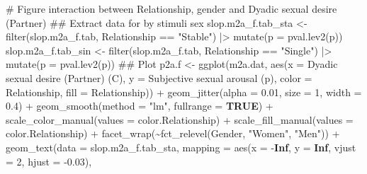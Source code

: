 \documentclass[
  bookmarksnumbered]{article}
\newenvironment{Shaded}{\begin{snugshade}}{\end{snugshade}}
\newcommand{\AttributeTok}[1]{\textcolor[rgb]{0.80,0.80,0.80}{#1}}
\newcommand{\CommentTok}[1]{\textcolor[rgb]{0.50,0.62,0.50}{#1}}
\newcommand{\ConstantTok}[1]{\textcolor[rgb]{0.86,0.64,0.64}{\textbf{#1}}}
\newcommand{\DecValTok}[1]{\textcolor[rgb]{0.86,0.86,0.80}{#1}}
\newcommand{\DocumentationTok}[1]{\textcolor[rgb]{0.50,0.62,0.50}{#1}}
\newcommand{\FloatTok}[1]{\textcolor[rgb]{0.75,0.75,0.82}{#1}}
\newcommand{\FunctionTok}[1]{\textcolor[rgb]{0.94,0.94,0.56}{#1}}
\newcommand{\NormalTok}[1]{\textcolor[rgb]{0.80,0.80,0.80}{#1}}
\newcommand{\OtherTok}[1]{\textcolor[rgb]{0.94,0.94,0.56}{#1}}
\newcommand{\SpecialCharTok}[1]{\textcolor[rgb]{0.86,0.64,0.64}{#1}}
\newcommand{\StringTok}[1]{\textcolor[rgb]{0.80,0.58,0.58}{#1}}
\begin{document}
\begin{Shaded}
\begin{Highlighting}[]
\CommentTok{\# Figure interaction between Relationship, gender and Dyadic sexual desire (Partner)}
\DocumentationTok{\#\# Extract data for by stimuli sex}
\NormalTok{slop.m2a\_f.tab\_sta }\OtherTok{\textless{}{-}} \FunctionTok{filter}\NormalTok{(slop.m2a\_f.tab, Relationship }\SpecialCharTok{==} \StringTok{"Stable"}\NormalTok{) }\SpecialCharTok{|\textgreater{}}
  \FunctionTok{mutate}\NormalTok{(}\AttributeTok{p =} \FunctionTok{pval.lev2}\NormalTok{(p))}
\NormalTok{slop.m2a\_f.tab\_sin }\OtherTok{\textless{}{-}} \FunctionTok{filter}\NormalTok{(slop.m2a\_f.tab, Relationship }\SpecialCharTok{==} \StringTok{"Single"}\NormalTok{) }\SpecialCharTok{|\textgreater{}}
  \FunctionTok{mutate}\NormalTok{(}\AttributeTok{p =} \FunctionTok{pval.lev2}\NormalTok{(p))}
\DocumentationTok{\#\# Plot}
\NormalTok{p2a.f }\OtherTok{\textless{}{-}} \FunctionTok{ggplot}\NormalTok{(m2a.dat, }\FunctionTok{aes}\NormalTok{(}\AttributeTok{x =} \StringTok{\textasciigrave{}}\AttributeTok{Dyadic sexual desire (Partner) (C)}\StringTok{\textasciigrave{}}\NormalTok{,}
                             \AttributeTok{y =} \StringTok{\textasciigrave{}}\AttributeTok{Subjective sexual arousal (p)}\StringTok{\textasciigrave{}}\NormalTok{,}
                             \AttributeTok{color =}\NormalTok{ Relationship, }\AttributeTok{fill =}\NormalTok{ Relationship)) }\SpecialCharTok{+}
  \FunctionTok{geom\_jitter}\NormalTok{(}\AttributeTok{alpha =} \FloatTok{0.01}\NormalTok{, }\AttributeTok{size =} \DecValTok{1}\NormalTok{, }\AttributeTok{width =} \FloatTok{0.4}\NormalTok{) }\SpecialCharTok{+}
  \FunctionTok{geom\_smooth}\NormalTok{(}\AttributeTok{method =} \StringTok{"lm"}\NormalTok{, }\AttributeTok{fullrange =} \ConstantTok{TRUE}\NormalTok{) }\SpecialCharTok{+}
  \FunctionTok{scale\_color\_manual}\NormalTok{(}\AttributeTok{values =}\NormalTok{ color.Relationship) }\SpecialCharTok{+}
  \FunctionTok{scale\_fill\_manual}\NormalTok{(}\AttributeTok{values =}\NormalTok{ color.Relationship) }\SpecialCharTok{+}
  \FunctionTok{facet\_wrap}\NormalTok{(}\SpecialCharTok{\textasciitilde{}}\FunctionTok{fct\_relevel}\NormalTok{(Gender, }\StringTok{"Women"}\NormalTok{, }\StringTok{"Men"}\NormalTok{)) }\SpecialCharTok{+}
  \FunctionTok{geom\_text}\NormalTok{(}\AttributeTok{data =}\NormalTok{ slop.m2a\_f.tab\_sta,}
            \AttributeTok{mapping =} \FunctionTok{aes}\NormalTok{(}\AttributeTok{x =} \SpecialCharTok{{-}}\ConstantTok{Inf}\NormalTok{, }\AttributeTok{y =} \ConstantTok{Inf}\NormalTok{,}
            \AttributeTok{vjust =} \DecValTok{2}\NormalTok{, }\AttributeTok{hjust =} \SpecialCharTok{{-}}\FloatTok{0.03}\NormalTok{),}

\end{Highlighting}
\end{Shaded}
\end{document}
